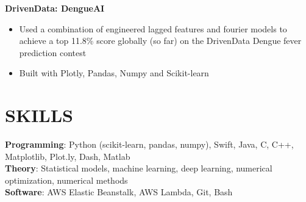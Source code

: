 \documentclass[margin]{res}
\begin{document}
\begin{resume}
    \textbf{DrivenData: DengueAI}
    \begin{itemize}
        \item Used a combination of engineered lagged features and fourier models to achieve a top 11.8\% score globally (so far) on the DrivenData Dengue fever prediction contest
        \item Built with Plotly, Pandas, Numpy and Scikit-learn
    \end{itemize}\vspace*{-8pt}



\section{SKILLS} 
    \textbf{Programming}: Python (scikit-learn, pandas, numpy), Swift, Java, C, C++,\\Matplotlib, Plot.ly, Dash, Matlab\\
    \textbf{Theory}: Statistical models, machine learning, deep learning, numerical optimization, numerical methods \\
    \textbf{Software}: AWS Elastic Beanstalk, AWS Lambda, Git, Bash

\end{resume}
\end{document}
